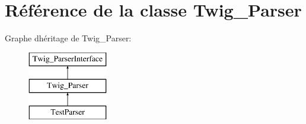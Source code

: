 \hypertarget{class_twig___parser}{}\section{Référence de la classe Twig\+\_\+\+Parser}
\label{class_twig___parser}
Graphe d\textquotesingle{}héritage de Twig\+\_\+\+Parser\+:\begin{figure}[H]
\begin{center}
\leavevmode
\includegraphics[height=3.000000cm]{class_twig___parser}
\end{center}
\end{figure}
